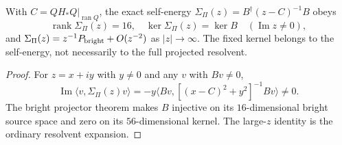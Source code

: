 \documentclass[12pt,a4paper]{article}
\begin{document}
\begin{corollary}
\label{p10:cor:v368-native-character-schur-support}
With $C=QH_*Q\vert_{\operatorname{ran}Q}$, the exact self-energy
$\Sigma_{\Pi}(z)=B^\dagger(z-C)^{-1}B$ obeys
\[
\boxed{\operatorname{rank}\Sigma_{\Pi}(z)=16,
\quad\ker\Sigma_{\Pi}(z)=\ker B\quad(\operatorname{Im}z\ne0),}
\]
and $\Sigma_\Pi(z)=z^{-1}P_{\rm bright}+O(z^{-2})$ as
$|z|\to\infty$. The fixed kernel belongs to the self-energy,
not necessarily to the full projected resolvent.
\end{corollary}
\begin{proof}
For $z=x+iy$ with $y\ne0$ and any $v$ with $Bv\ne0$,
\[
\operatorname{Im}\langle v,\Sigma_{\Pi}(z)v\rangle
=-y\langle Bv,[(x-C)^2+y^2]^{-1}Bv\rangle\ne0.
\]
The bright projector theorem makes $B$ injective on its
$16$-dimensional bright source space and zero on its $56$-dimensional
kernel. The large-$z$ identity is the ordinary resolvent expansion.
\end{proof}
\end{document}
